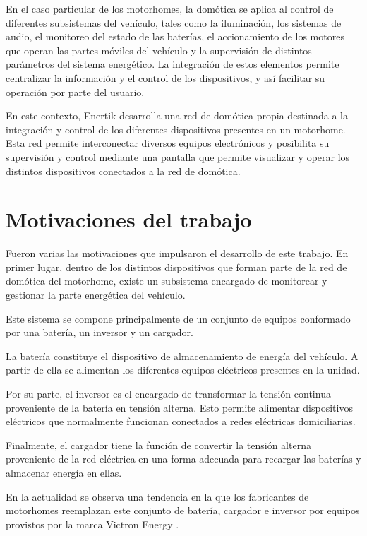 En el caso particular de los motorhomes, la domótica se aplica al control de 
diferentes subsistemas del vehículo, tales como la iluminación, los sistemas de 
audio, el monitoreo del estado de las baterías, el accionamiento de los motores 
que operan las partes móviles del vehículo y la supervisión de distintos 
parámetros del sistema energético. La integración de estos elementos permite 
centralizar la información y el control de los dispositivos, y así facilitar su 
operación por parte del usuario.

En este contexto, Enertik desarrolla una red de domótica propia destinada 
a la integración y control de los diferentes dispositivos presentes en un 
motorhome. Esta red permite interconectar diversos equipos electrónicos y 
posibilita su supervisión y control mediante una pantalla que permite 
visualizar y operar los distintos dispositivos conectados a la red de domótica.

\section{Motivaciones del trabajo}
\label{sec:1_2}
Fueron varias las motivaciones que impulsaron el desarrollo de este trabajo. 
En primer lugar, dentro de los distintos dispositivos que forman parte de la 
red de domótica del motorhome, existe un subsistema encargado de monitorear 
y gestionar la parte energética del vehículo.

Este sistema se compone principalmente de un conjunto de equipos conformado 
por una batería, un inversor y un cargador.

La batería constituye el dispositivo de almacenamiento de energía del vehículo. 
A partir de ella se alimentan los diferentes equipos eléctricos presentes en 
la unidad.

Por su parte, el inversor es el encargado de transformar la tensión continua 
proveniente de la batería en tensión alterna. Esto permite alimentar dispositivos 
eléctricos que normalmente funcionan conectados a redes eléctricas domiciliarias.

Finalmente, el cargador tiene la función de convertir la tensión alterna 
proveniente de la red eléctrica en una forma adecuada para recargar las 
baterías y almacenar energía en ellas.

En la actualidad se observa una tendencia en la que los fabricantes de motorhomes reemplazan este conjunto de batería, cargador e inversor por equipos provistos por la marca Victron Energy \citep{web_victron}.

